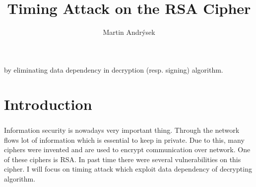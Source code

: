 \documentclass[thesis=B,english]{FITthesis}[2012/10/20]
\title{Timing Attack on the RSA Cipher}
\author{Martin Andr{\' y}sek} %
\begin{document}
by eliminating
data dependency in decryption (resp. signing) algorithm.


\chapter{Introduction}

\paragraph*{}{
Information security is nowadays very important thing. Through the network flows lot of information which is essential to keep in private. Due to this, many ciphers were invented and are used to encrypt communication over network. One of these ciphers is RSA. In past time there were several vulnerabilities on this cipher. I will focus on timing attack which exploit data dependency of decrypting algorithm. 
}
\end{document}
